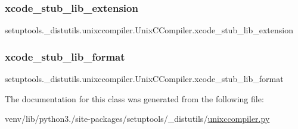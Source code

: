 \subsubsection{\texorpdfstring{xcode\+\_\+stub\+\_\+lib\+\_\+extension}{xcode\_stub\_lib\_extension}}
{\footnotesize\ttfamily setuptools.\+\_\+distutils.\+unixccompiler.\+Unix\+C\+Compiler.\+xcode\+\_\+stub\+\_\+lib\+\_\+extension\hspace{0.3cm}{\ttfamily [static]}}

\mbox{\label{classsetuptools_1_1__distutils_1_1unixccompiler_1_1UnixCCompiler_a55504f296a1f1209ad5fde4783fb86ce}} 
\subsubsection{\texorpdfstring{xcode\+\_\+stub\+\_\+lib\+\_\+format}{xcode\_stub\_lib\_format}}
{\footnotesize\ttfamily setuptools.\+\_\+distutils.\+unixccompiler.\+Unix\+C\+Compiler.\+xcode\+\_\+stub\+\_\+lib\+\_\+format\hspace{0.3cm}{\ttfamily [static]}}



The documentation for this class was generated from the following file\+:\begin{DoxyCompactItemize}
\item 
venv/lib/python3./site-\/packages/setuptools/\+\_\+distutils/\hyperlink{setuptools_2__distutils_2unixccompiler_8py}{unixccompiler.\+py}\end{DoxyCompactItemize}
